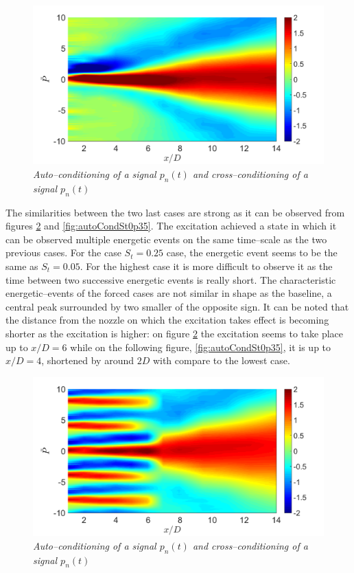 \begin{figure}
	\centering
	\includegraphics[width=1\textwidth]{Figures/conditioning/autoCondSt0p05.png}
	\caption{\textit{Auto--conditioning of a signal $p_n(t)$ and cross--conditioning of a signal $p_n(t)$}}
	\label{fig:autoCondSt0p05}
\end{figure}

The similarities between the two last cases are strong as it can be observed from figures \ref{fig:autoCondSt0p25} and \ref{fig:autoCondSt0p35}. The excitation achieved a state in which it can be observed multiple energetic events on the same time--scale as the two previous cases. For the case $S_t = 0.25$ case, the energetic event seems to be the same as $S_t = 0.05$. For the highest case it is more difficult to observe it as the time between two successive energetic events is really short. The characteristic energetic--events of the forced cases are not similar in shape as the baseline, a central peak surrounded by two smaller of the opposite sign. It can be noted that the distance from the nozzle on which the excitation takes effect is becoming shorter as the excitation is higher: on figure \ref{fig:autoCondSt0p25} the excitation seems to take place up to $x/D=6$ while on the following figure, \ref{fig:autoCondSt0p35}, it is up to $x/D=4$, shortened by around $2D$ with compare to the lowest case. 
\begin{figure}
	\centering
	\includegraphics[width=1\textwidth]{Figures/conditioning/autoCondSt0p25.png}
	\caption{\textit{Auto--conditioning of a signal $p_n(t)$ and cross--conditioning of a signal $p_n(t)$}}
	\label{fig:autoCondSt0p25}
\end{figure}

